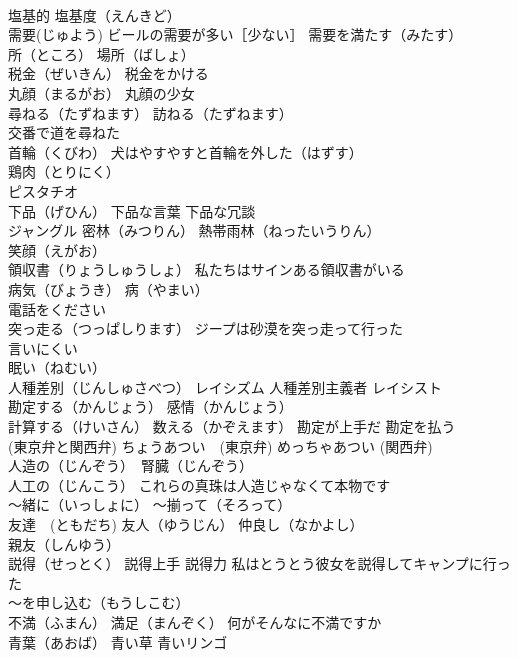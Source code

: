 \documentclass[8pt]{extreport}
\begin{document}
\begin{CJK}{UTF8}{min}
\\	塩基的 塩基度（えんきど）
\\	需要(じゅよう) ビールの需要が多い［少ない］ 需要を満たす（みたす）
\\	所（ところ） 場所（ばしょ）
\\	税金（ぜいきん） 税金をかける
\\	丸顔（まるがお） 丸顔の少女
\\	尋ねる（たずねます） 訪ねる（たずねます）
\\	交番で道を尋ねた
\\	首輪（くびわ） 犬はやすやすと首輪を外した（はずす）
\\	鶏肉（とりにく）
\\	ピスタチオ
\\	下品（げひん） 下品な言葉 下品な冗談
\\	ジャングル 密林（みつりん） 熱帯雨林（ねったいうりん） 
\\	笑顔（えがお）
\\	領収書（りょうしゅうしょ） 私たちはサインある領収書がいる
\\	病気（びょうき） 病（やまい）
\\	電話をください
\\	突っ走る（つっぱしります） ジープは砂漠を突っ走って行った
\\	言いにくい
\\	眠い（ねむい）
\\	人種差別（じんしゅさべつ） レイシズム 人種差別主義者 レイシスト
\\	勘定する（かんじょう） 感情（かんじょう）
\\	計算する（けいさん） 数える（かぞえます） 勘定が上手だ 勘定を払う
\\	(東京弁と関西弁)	ちょうあつい　(東京弁) めっちゃあつい (関西弁)
\\	人造の（じんぞう）　腎臓（じんぞう）
\\	人工の（じんこう） これらの真珠は人造じゃなくて本物です
\\	～緒に（いっしょに） ～揃って（そろって）
\\	友達　(ともだち) 友人（ゆうじん） 仲良し（なかよし）
\\	親友（しんゆう）
\\	説得（せっとく） 説得上手 説得力 私はとうとう彼女を説得してキャンプに行った
\\	～を申し込む（もうしこむ）
\\	不満（ふまん） 満足（まんぞく） 何がそんなに不満ですか
\\	青葉（あおば） 青い草 青いリンゴ

\end{CJK}
\end{document}

